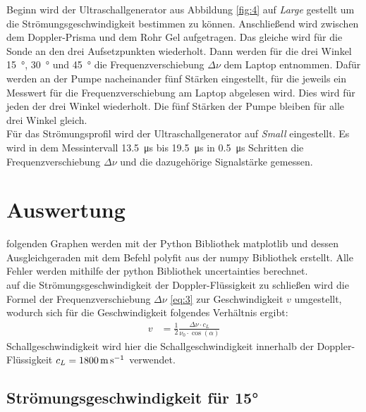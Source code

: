     \justifying Beginn wird der Ultraschallgenerator aus Abbildung \ref{fig:4} auf \textit{Large} gestellt um die Strömungsgeschwindigkeit bestimmen zu können. Anschließend wird zwischen
    dem Doppler-Prisma und dem Rohr Gel aufgetragen. Das gleiche wird für die Sonde an den drei Aufsetzpunkten wiederholt. Dann werden für die drei Winkel \SI{15}{\degree}, 
    \SI{30}{\degree} und \SI{45}{\degree} die Frequenzverschiebung $\Delta\nu$ dem Laptop entnommen. Dafür werden an der Pumpe nacheinander fünf Stärken eingestellt, für die jeweils ein Messwert 
    für die Frequenzverschiebung am Laptop abgelesen wird. Dies wird für jeden der drei Winkel wiederholt. Die fünf Stärken der Pumpe bleiben für alle drei Winkel gleich.\\
    Für das Strömungsprofil wird der Ultraschallgenerator auf \textit{Small} eingestellt. Es wird in dem Messintervall \SI{13.5}{\micro\second} bis \SI{19.5}{\micro\second} in \SI{0.5}{\micro\second} Schritten die 
    Frequenzverschiebung $\Delta\nu$ und die dazugehörige Signalstärke gemessen. 

\newpage
\section{Auswertung}

    \justifying folgenden Graphen werden mit der Python Bibliothek matplotlib \cite{matplotlib} und dessen Ausgleichgeraden mit dem Befehl polyfit aus der numpy Bibliothek 
    \cite{numpy} erstellt. Alle Fehler werden mithilfe der python Bibliothek uncertainties \cite{uncertainties} berechnet.\\
    \justifying auf die Strömungsgeschwindigkeit der Doppler-Flüssigkeit zu schließen wird die Formel der Frequenzverschiebung $\Delta\nu$ \eqref{eq:3} zur Geschwindigkeit
    $v$ umgestellt, wodurch sich für die Geschwindigkeit folgendes Verhältnis ergibt:
    \begin{align}
        v &= \frac{1}{2} \frac{\Delta\nu \cdot c_L}{\nu_0\cdot \cos(\alpha)} \label{eq:5}
    \end{align}
    \justifying Schallgeschwindigkeit wird hier die Schallgeschwindigkeit innerhalb der Doppler-Flüssigkeit
    $c_L=\text{\SI{1800}{\meter\per\second}}$ verwendet. 

\newpage   
\subsection{Strömungsgeschwindigkeit für 15°}\label{sec:1}

